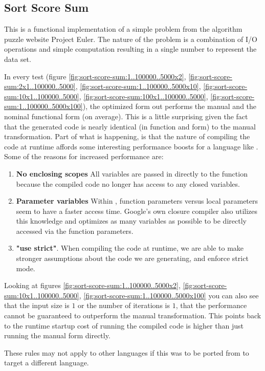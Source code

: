 \subsection{Sort Score Sum}\label{Sort Score Sum}
This is a functional implementation of a simple problem from the algorithm puzzle website Project Euler.  The nature of the problem is a combination of I/O operations and simple computation resulting in a single number to represent the data set. \cite{euler05}

In every test (figure \ref{fig:sort-score-sum:1..100000..5000x2}, \ref{fig:sort-score-sum:2x1..100000..5000}, \ref{fig:sort-score-sum:1..100000..5000x10}, \ref{fig:sort-score-sum:10x1..100000..5000}, \ref{fig:sort-score-sum:100x1..100000..5000}, \ref{fig:sort-score-sum:1..100000..5000x100}), the optimized form out performs the manual and the nominal functional form (on average).  This is a little surprising given the fact that the generated code is nearly identical (in function and form) to the manual transformation.  Part of what is happening,  is that the nature of compiling the code at runtime affords some interesting performance boosts for a language like \javascript. Some of the reasons for increased performance are:
\begin{enumerate}
  \item \textbf{No enclosing scopes} All variables are passed in directly to the function because the compiled code no longer has access to any closed variables.
  \item \textbf{Parameter variables}  Within \veight, function parameters versus local parameters seem to have a faster access time.  Google's own closure compiler also utilizes this knowledge and optimizes as many variables as possible to be directly accessed via the function parameters. 
  \item \textbf{"use strict"}.  When compiling the code at runtime, we are able to make stronger assumptions about the code we are generating, and enforce strict mode.     
\end{enumerate}

Looking at figures \ref{fig:sort-score-sum:1..100000..5000x2}, \ref{fig:sort-score-sum:10x1..100000..5000}, \ref{fig:sort-score-sum:1..100000..5000x100} you can also see that the input size is $1$ or the number of iterations is $1$, that the performance cannot be guaranteed to outperform the manual transformation.  This points back to the runtime startup cost of running the compiled code is higher than just running the manual form directly. 

These rules may not apply to other languages if this was to be ported from \javascript to target a different language.

